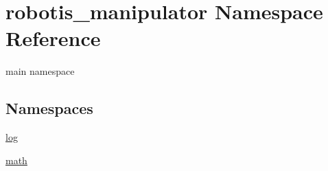 \hypertarget{namespacerobotis__manipulator}{}\section{robotis\+\_\+manipulator Namespace Reference}
\label{namespacerobotis__manipulator}


main namespace  


\subsection*{Namespaces}
\begin{DoxyCompactItemize}
\item 
 \hyperlink{namespacerobotis__manipulator_1_1log}{log}
\item 
 \hyperlink{namespacerobotis__manipulator_1_1math}{math}
\end{DoxyCompactItemize}
